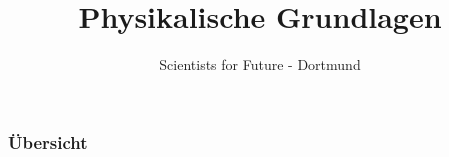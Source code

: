 \documentclass[11pt]{beamer}
\author{Scientists for Future - Dortmund}
\title{Physikalische Grundlagen}
\begin{document}
	\begin{frame}[plain]
		\maketitle
	\end{frame}

	\begin{frame}
		\frametitle{Übersicht}
		\tableofcontents
	\end{frame}



	

	

	
\end{document}
